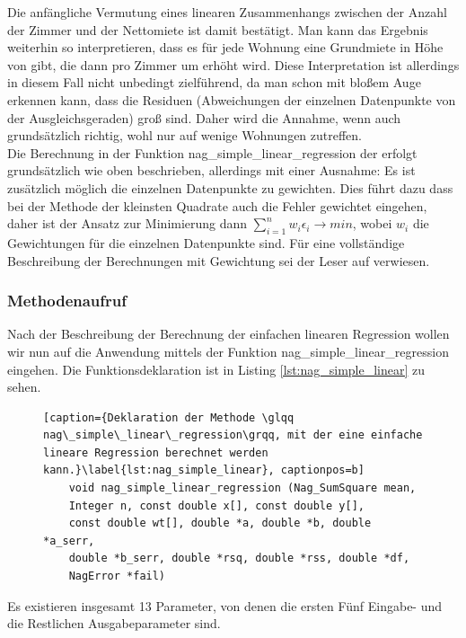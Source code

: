 Die anfängliche Vermutung eines linearen Zusammenhangs zwischen der Anzahl der Zimmer und der Nettomiete ist damit bestätigt.
Man kann das Ergebnis weiterhin so interpretieren, dass es für jede Wohnung eine Grundmiete in Höhe von  gibt, die dann pro Zimmer um  erhöht wird.
Diese Interpretation ist allerdings in diesem Fall nicht unbedingt zielführend, da man schon mit bloßem Auge erkennen kann, dass die Residuen (Abweichungen der einzelnen Datenpunkte von der Ausgleichsgeraden) groß sind.
Daher wird die Annahme, wenn auch grundsätzlich richtig, wohl nur auf wenige Wohnungen zutreffen.
\\

Die Berechnung in der Funktion nag\_simple\_linear\_regression der \naglib erfolgt grundsätzlich wie oben beschrieben, allerdings mit einer Ausnahme: Es ist zusätzlich möglich die einzelnen Datenpunkte zu gewichten.
Dies führt dazu dass bei der Methode der kleinsten Quadrate auch die Fehler gewichtet eingehen, daher ist der Ansatz zur Minimierung dann $\sum\limits_{i=1}^{n}w_i\epsilon_i \rightarrow min$, wobei $w_i$ die Gewichtungen für die einzelnen Datenpunkte sind.
Für eine vollständige Beschreibung der Berechnungen mit Gewichtung sei der Leser auf \cite{nag:simple_regression} verwiesen.

\subsubsection{Methodenaufruf}
\label{sec:sim_reg_anwendung}

Nach der Beschreibung der Berechnung der einfachen linearen Regression wollen wir nun auf die Anwendung mittels der Funktion nag\_simple\_linear\_regression eingehen.
Die Funktionsdeklaration ist in Listing \ref{lst:nag_simple_linear} zu sehen.
\begin{figure}[t]
  \begin{lstlisting}[caption={Deklaration der Methode \glqq nag\_simple\_linear\_regression\grqq, mit der eine einfache lineare Regression berechnet werden kann.}\label{lst:nag_simple_linear}, captionpos=b]
    void nag_simple_linear_regression (Nag_SumSquare mean, 
    Integer n, const double x[], const double y[], 
    const double wt[], double *a, double *b, double *a_serr, 
    double *b_serr, double *rsq, double *rss, double *df,
    NagError *fail)
  \end{lstlisting} 
\end{figure}
Es existieren insgesamt 13 Parameter, von denen die ersten Fünf Eingabe- und die Restlichen Ausgabeparameter sind.

